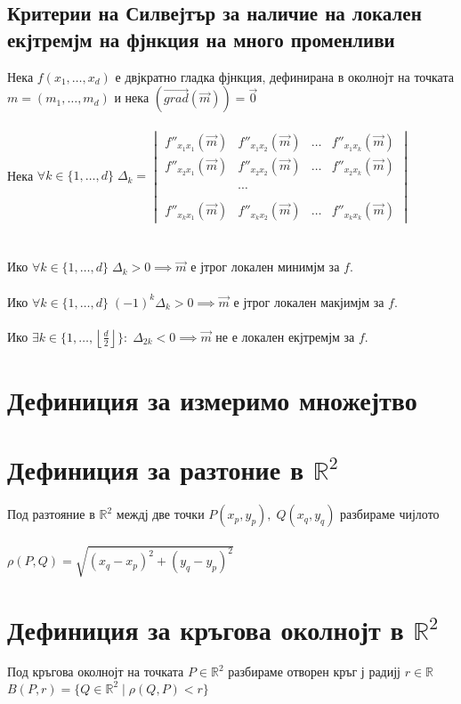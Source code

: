 \documentclass[14pt]{extarticle}
\newcommand{\R}{\mathbb{R}}
\newcommand{\Vector}[1]{\overrightarrow{#1}}
\begin{document}
\subsection*{Критерии на Силвејтър за наличие на локален екјтремјм на фјнкция на много променливи}
Нека \(f(x_1, \dots, x_d)\) е двјкратно гладка фјнкция, дефинирана в околнојт на точката \(m = (m_1, \dots, m_d)\) и нека \((\Vector{grad}(\Vector{m})) = \Vector{0}\) \\\\
Нека \(\forall k \in \{1, \dots, d\} \; \Delta_k = \begin{vmatrix}
f''_{x_1x_1}(\Vector{m}) & f''_{x_1x_2}(\Vector{m}) & \dots & f''_{x_1x_k}(\Vector{m}) \\
f''_{x_2x_1}(\Vector{m}) & f''_{x_2x_2}(\Vector{m}) & \dots & f''_{x_2x_k}(\Vector{m}) \\
~ \\
 ~ &  \cdots & ~ \\
~ \\
f''_{x_kx_1}(\Vector{m}) & f''_{x_kx_2}(\Vector{m}) & \dots & f''_{x_kx_k}(\Vector{m})
\end{vmatrix} \) \\\\\\
Ико \(\forall k \in \{1, \dots, d\} \; \Delta_k > 0 \implies \Vector{m}\) е јтрог локален минимјм за \(f\). \\\\
Ико \(\forall k \in \{1, \dots, d\} \; (-1)^k\Delta_k > 0 \implies \Vector{m}\) е јтрог локален макјимјм за \(f\). \\\\
Ико \(\exists k \in \{1, \dots, \left\lfloor \frac{d}{2} \right\rfloor\} : \; \Delta_{2k} < 0 \implies \Vector{m}\) не е локален екјтремјм за \(f\).
\section*{Дефиниция за измеримо множејтво}
\section*{Дефиниция за разтоние в \(\R^2\)}
Под разтояние в \(\R^2\) междј две точки \(P(x_p, y_p), \; Q(x_q, y_q)\) разбираме чијлото \\\\
\(\rho(P, Q) = \sqrt{(x_q - x_p)^2 + (y_q - y_p)^2}\)
\section*{Дефиниция за кръгова околнојт в \(\R^2\)}
Под кръгова околнојт на точката \(P \in \R^2\) разбираме отворен кръг ј радијј \(r \in \R\) \(B(P, r) = \{Q \in \R^2 \; | \; \rho(Q, P) < r\}\)
\end{document}

